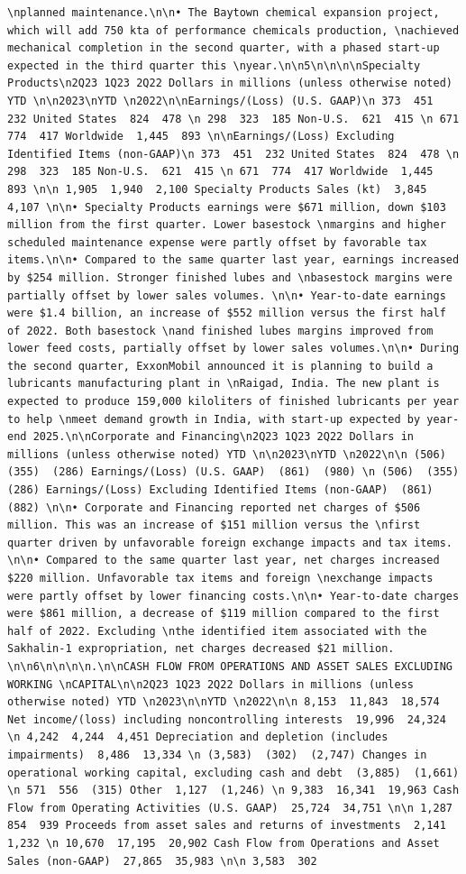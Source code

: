 \documentclass[
  letterpaper,
  DIV=11,
  numbers=noendperiod]{scrreprt}
\begin{document}
\begin{verbatim}
\nplanned maintenance.\n\n• The Baytown chemical expansion project, which will add 750 kta of performance chemicals production, \nachieved mechanical completion in the second quarter, with a phased start-up expected in the third quarter this \nyear.\n\n5\n\n\n\nSpecialty Products\n2Q23 1Q23 2Q22 Dollars in millions (unless otherwise noted) YTD \n\n2023\nYTD \n2022\n\nEarnings/(Loss) (U.S. GAAP)\n 373  451  232 United States  824  478 \n 298  323  185 Non-U.S.  621  415 \n 671  774  417 Worldwide  1,445  893 \n\nEarnings/(Loss) Excluding Identified Items (non-GAAP)\n 373  451  232 United States  824  478 \n 298  323  185 Non-U.S.  621  415 \n 671  774  417 Worldwide  1,445  893 \n\n 1,905  1,940  2,100 Specialty Products Sales (kt)  3,845  4,107 \n\n• Specialty Products earnings were $671 million, down $103 million from the first quarter. Lower basestock \nmargins and higher scheduled maintenance expense were partly offset by favorable tax items.\n\n• Compared to the same quarter last year, earnings increased by $254 million. Stronger finished lubes and \nbasestock margins were partially offset by lower sales volumes. \n\n• Year-to-date earnings were $1.4 billion, an increase of $552 million versus the first half of 2022. Both basestock \nand finished lubes margins improved from lower feed costs, partially offset by lower sales volumes.\n\n• During the second quarter, ExxonMobil announced it is planning to build a lubricants manufacturing plant in \nRaigad, India. The new plant is expected to produce 159,000 kiloliters of finished lubricants per year to help \nmeet demand growth in India, with start-up expected by year-end 2025.\n\nCorporate and Financing\n2Q23 1Q23 2Q22 Dollars in millions (unless otherwise noted) YTD \n\n2023\nYTD \n2022\n\n (506)  (355)  (286) Earnings/(Loss) (U.S. GAAP)  (861)  (980) \n (506)  (355)  (286) Earnings/(Loss) Excluding Identified Items (non-GAAP)  (861)  (882) \n\n• Corporate and Financing reported net charges of $506 million. This was an increase of $151 million versus the \nfirst quarter driven by unfavorable foreign exchange impacts and tax items.  \n\n• Compared to the same quarter last year, net charges increased $220 million. Unfavorable tax items and foreign \nexchange impacts were partly offset by lower financing costs.\n\n• Year-to-date charges were $861 million, a decrease of $119 million compared to the first half of 2022. Excluding \nthe identified item associated with the Sakhalin-1 expropriation, net charges decreased $21 million. \n\n6\n\n\n\n.\n\nCASH FLOW FROM OPERATIONS AND ASSET SALES EXCLUDING WORKING \nCAPITAL\n\n2Q23 1Q23 2Q22 Dollars in millions (unless otherwise noted) YTD \n2023\n\nYTD \n2022\n\n 8,153  11,843  18,574 Net income/(loss) including noncontrolling interests  19,996  24,324 \n 4,242  4,244  4,451 Depreciation and depletion (includes impairments)  8,486  13,334 \n (3,583)  (302)  (2,747) Changes in operational working capital, excluding cash and debt  (3,885)  (1,661) \n 571  556  (315) Other  1,127  (1,246) \n 9,383  16,341  19,963 Cash Flow from Operating Activities (U.S. GAAP)  25,724  34,751 \n\n 1,287  854  939 Proceeds from asset sales and returns of investments  2,141  1,232 \n 10,670  17,195  20,902 Cash Flow from Operations and Asset Sales (non-GAAP)  27,865  35,983 \n\n 3,583  302 
\end{verbatim}
\end{document}

